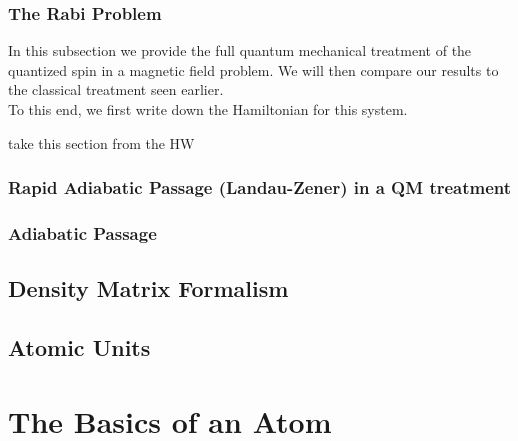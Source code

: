 \documentclass{book}
\theoremstyle{definition}
\begin{document}
\subsection{The Rabi Problem}


In this subsection we provide the full quantum mechanical treatment of the quantized spin in a magnetic field problem. We will then compare our results to the classical treatment seen earlier. \\


To this end, we first write down the Hamiltonian for this system. 







take this section from the HW


\subsection{Rapid Adiabatic Passage (Landau-Zener) in a QM treatment}


\subsection{Adiabatic Passage}



\section{Density Matrix Formalism}











\section{Atomic Units}







\chapter{The Basics of an Atom}






\end{document}
